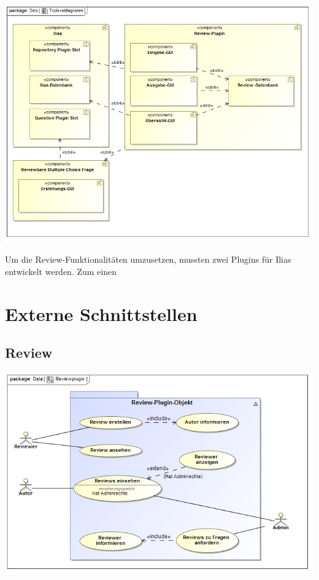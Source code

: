 \documentclass[a4paper]{scrreprt}
\begin{document}
\includegraphics[width=1.0\textwidth]{Component_Diagram__Topleveldiagramm.png}
\label{Toplevel-Architektur}

Um die Review-Funktionalitäten umzusetzen, mussten zwei Plugins für Ilias entwickelt werden. 
Zum einen 

\section{Externe Schnittstellen}

\newpage
\subsection{Review}

\includegraphics[width=1.0\textwidth]{Use_Case_Diagram__Reviewplugin.png}
\label{Review}
\end{document}
